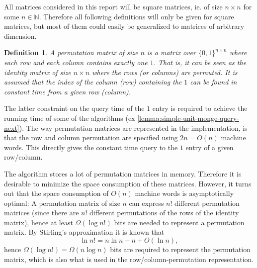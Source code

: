 \documentclass[twoside,11pt,openright]{report}
\newtheorem{mydef}{Definition}
\begin{document}
All matrices considered in this report will be square matrices, ie. of size $n \times n$ for some $n \in \mathbb{N}$. Therefore all following definitions will only be given for square matrices, but most of them could easily be generalized to matrices of arbitrary dimension.

\begin{mydef}
  A permutation matrix of size $n$ is a matrix over $\{0,1\}^{n \times n}$ where each row and each column contains exactly one $1$. That is, it can be seen as the identity matrix of size $n \times n$ where the rows (or columns) are permuted.
  It is assumed that the index of the column (row) containing the $1$ can be found in constant time from a given row (column).
\end{mydef}
The latter constraint on the query time of the $1$ entry is required to achieve the running time of some of the algorithms (ex \cref{lemma:simple-unit-monge-query-next}). The way permutation matrices are represented in the implementation, is that the row and column permutation are specified using $2n = O(n)$ machine words. This directly gives the constant time query to the $1$ entry of a given row/column.

The algorithm stores a lot of permutation matrices in memory. Therefore it is desirable to minimize the space consumption of these matrices. However, it turns out that the space consumption of $O(n)$ machine words is asymptotically optimal: A permutation matrix of size $n$ can express $n!$ different permutation matrices (since there are $n!$ different permutations of the rows of the identity matrix), hence at least $\Omega(\log{n!})$ bits are needed to represent a permutation matrix. By Stirling's approximation it is known that
\[
  \ln{n!} = n \ln{n} - n + O(\ln{n}),
\]
hence $\Omega(\log{n!}) = \Omega(n \log{n})$ bits are required to represent the permutation matrix, which is also what is used in the row/column-permutation representation.
\end{document}
